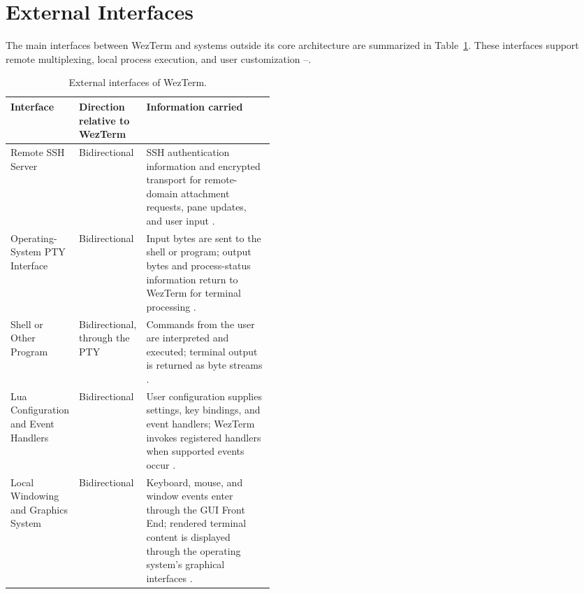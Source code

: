 \section{External Interfaces}
\label{sec:external-interfaces}

The main interfaces between WezTerm and systems outside its core architecture are summarized in Table~\ref{tab:external-interfaces}. These interfaces support remote multiplexing, local process execution, and user customization \cite{multiplexing}--\cite{update-status}.

\begin{table}[!htbp]
  \centering
  \caption{External interfaces of WezTerm.}
  \label{tab:external-interfaces}
  \begin{tabularx}{\linewidth}{@{}>{\raggedright\arraybackslash}p{0.24\linewidth}>{\raggedright\arraybackslash}p{0.20\linewidth}X@{}}
    \toprule
    \textbf{Interface} & \textbf{Direction relative to WezTerm} & \textbf{Information carried} \\
    \midrule
    Remote SSH Server & Bidirectional & SSH authentication information and encrypted transport for remote-domain attachment requests, pane updates, and user input \cite{ssh,sshdomain}. \\
    Operating-System PTY Interface & Bidirectional & Input bytes are sent to the shell or program; output bytes and process-status information return to WezTerm for terminal processing \cite{mux-api,term-crate}. \\
    Shell or Other Program & Bidirectional, through the PTY & Commands from the user are interpreted and executed; terminal output is returned as byte streams \cite{multiplexing,term-crate}. \\
    Lua Configuration and Event Handlers & Bidirectional & User configuration supplies settings, key bindings, and event handlers; WezTerm invokes registered handlers when supported events occur \cite{event-registration,update-status}. \\
    Local Windowing and Graphics System & Bidirectional & Keyboard, mouse, and window events enter through the GUI Front End; rendered terminal content is displayed through the operating system's graphical interfaces \cite{gui-crate}. \\
    \bottomrule
  \end{tabularx}
\end{table}

